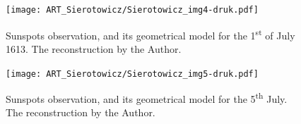 \begin{artengenv}
\begin{figure}[h]
	\centering
	\texttt{[image: ART\_Sierotowicz/Sierotowicz\_img4-druk.pdf]} 
	\caption{Sunspots observation, and its geometrical model for the 1\textsuperscript{st} of July 1613. The reconstruction
		by the Author.}
	\label{sier-fig4}
\end{figure}

\begin{figure}[h]
	\centering
	\texttt{[image: ART\_Sierotowicz/Sierotowicz\_img5-druk.pdf]} 
	\caption{Sunspots observation, and its geometrical model for the 5\textsuperscript{th} July. The reconstruction by the
		Author.}
	\label{sier-fig5}
\end{figure}






%
%
%
%
%
%
%
%
%
%
%
%
%
%
%
%






\end{artengenv}
